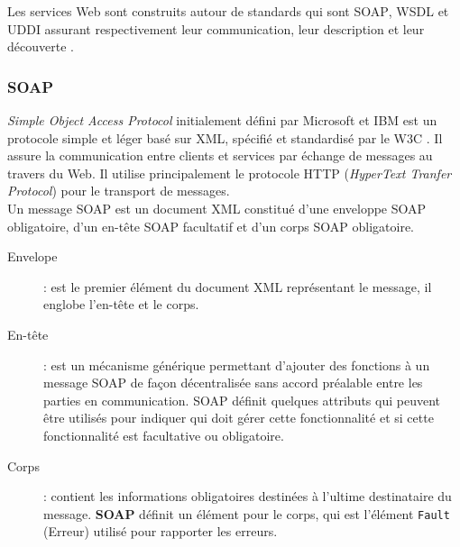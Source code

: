 	Les services Web sont construits autour de standards qui sont \textsc{SOAP}, \textsc{WSDL} et \textsc{UDDI} assurant respectivement leur
	communication, leur description et leur découverte .

	\subsubsection{SOAP}
		\textit{Simple Object Access Protocol} initialement défini par Microsoft et IBM \cite{box2000simple}
	       	est un protocole simple et léger basé sur \textsc{XML}, spécifié et standardisé par le \textsc{W3C}  
		\cite{mitra2003soap}. Il assure la communication entre clients et services par échange de messages au 
		travers du Web.  Il utilise principalement le protocole \textsc{HTTP} 
		(\textit{HyperText Tranfer Protocol}) pour le transport de messages.\\

		Un message \textsc{SOAP} est un document XML constitué d'une enveloppe \textsc{SOAP} obligatoire, 
		d'un en-tête \textsc{SOAP} facultatif et d'un corps \textsc{SOAP} obligatoire. 

		\renewcommand{\descriptionlabel}[1]{\hspace{1cm}\textsf{#1}}
		\begin{description} 
		    \item[Envelope]:  
			est le premier élément du document XML représentant le message,
			il englobe l'en-tête et le corps.

		    \item[En-tête]:
		       	est un mécanisme générique permettant d'ajouter des fonctions à un message
			\textsc{SOAP} de façon décentralisée sans accord préalable entre les parties en communication. 
			\textsc{SOAP} définit quelques attributs qui peuvent être utilisés pour indiquer qui doit gérer 
			cette fonctionnalité et si cette fonctionnalité est facultative ou obligatoire. 

		    \item[Corps]: 
			contient les informations obligatoires destinées à l'ultime destinataire du message.
			\textbf{SOAP} définit un élément pour le corps, qui est l'élément \texttt{Fault} (Erreur) 
			utilisé pour rapporter les erreurs.
		\end{description}

